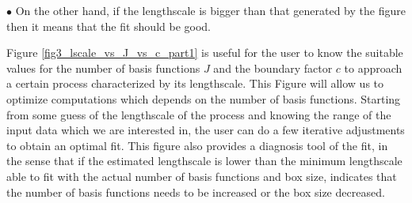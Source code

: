 \documentclass[]{interact}
\theoremstyle{plain}%
\theoremstyle{definition}
\theoremstyle{remark}
\begin{document}
$\bullet$ On the other hand, if the lengthscale is bigger than that generated by the figure then it means that the fit should be good.

Figure \ref{fig3_lscale_vs_J_vs_c_part1} is useful for the user to know the suitable values for the number of basis functions $J$ and the boundary factor $c$ to approach a certain process characterized by its lengthscale. This Figure will allow us to optimize computations which depends on the number of basis functions. Starting from some guess of the lengthscale of the process and knowing the range of the input data which we are interested in, the user can do a few iterative adjustments to obtain an optimal fit. This figure also provides a diagnosis tool of the fit, in the sense that if the estimated lengthscale is lower than the minimum lengthscale able to fit with the actual number of basis functions and box size, indicates that the number of basis functions needs to be increased or the box size decreased. 
\end{document}
